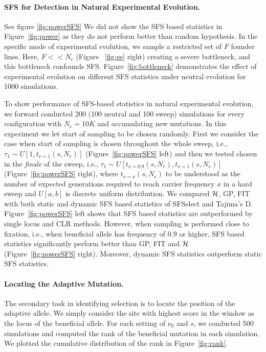 \documentclass[11pt]{article}
\begin{document}
\paragraph{SFS for Detection in Natural Experimental Evolution.} See
figure \ref{fig:powerSFS} We did not show the SFS based statistics in
Figure~\ref{fig:power} as they do not perform better than random hypothesis. In the specific
mode of experimental evolution, we sample a restricted set of $F$
founder lines. Here, $F<<N_e$ (Figure ~\ref{fig:ee} right) creating a severe
bottleneck, and this bottleneck confounds
SFS. Figure~\ref{fig:bottleneck} demonstrates the effect of
experimental evolution on different SFS statistics under neutral
evolution for 1000 simulations. 

To show performance of SFS-based statistics in natural experimental evolution, we forward conducted 200 (100 neutral and 100 sweep) simulations for every configuration with $N_e=10K$ and accumulating new mutations. In this experiment we let start of sampling to be chosen randomly.
First we consider the case when start of sampling is chosen throughout the whole sweep, i.e., 
 $\tau_1 \sim U\left[1,t_{\nu=1}(s,N_e)\right]$ (Figure~\ref{fig:powerSFS} left) and then we tested chosen in the \emph{finale} of the sweep, i.e., $\tau_1 \sim U\left[t_{\nu=0.9}(s,N_e),t_{\nu=1}(s,N_e)\right]$ (Figure~\ref{fig:powerSFS} right), where $t_{\nu=x}(s,N_e)$ to be understood as the number of expected generations required to reach carrier frequency $x$ in a hard sweep and $U[a,b]$ is discrete uniform distribution.
We compared ${\cal H}$, GP, FIT with both static and dynamic SFS based statistics of SFSelect and Tajima's D. Figure~\ref{fig:powerSFS} left shows that SFS based statistics are outperformed by single locus and CLR methods. However, when sampling is performed close to fixation, i.e., when beneficial allele has frequency of 0.9 or higher, SFS based statistics significantly perform better than GP, FIT and ${\cal H}$ (Figure~\ref{fig:powerSFS} right). Moreover, dynamic SFS statistics outperform static SFS statistics.


\paragraph{Locating the Adaptive Mutation.}
The secondary task in identifying selection is to locate the position
of the adaptive allele. We simply consider the site with highest score
in the window as the locus of the beneficial allele. For each setting
of $\nu_0$ and $s$, we conducted 500 simulations
and computed the rank of the beneficial mutation in each
simulation. We plotted the cumulative distribution of the rank in
Figure~\ref{fig:rank}.
\end{document}
